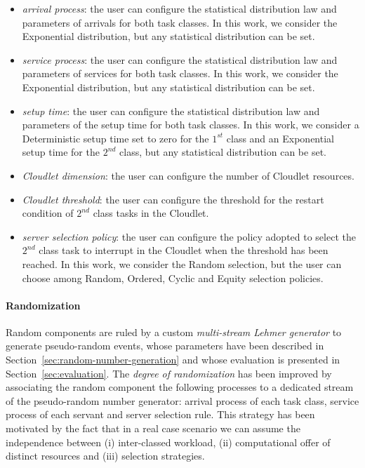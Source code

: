 \begin{itemize}
	\item \textit{arrival process}: the user can configure the statistical distribution law and parameters of arrivals for both task classes. In this work, we consider the Exponential distribution, but any statistical distribution can be set.
	
	\item \textit{service process}: the user can configure the statistical distribution law and parameters of services for both task classes. In this work, we consider the Exponential distribution, but any statistical distribution can be set.
	
	\item \textit{setup time}: the user can configure the statistical distribution law and parameters of the setup time for both task classes. In this work, we consider a Deterministic setup time set to zero for the $1^{st}$ class and an Exponential setup time for the $2^{nd}$ class, but any statistical distribution can be set.
	
	\item \textit{Cloudlet dimension}: the user can configure the number of Cloudlet resources.
	
	\item \textit{Cloudlet threshold}: the user can configure the threshold for the restart condition of $2^{nd}$ class tasks in the Cloudlet.
	
	\item \textit{server selection policy}: the user can configure the policy adopted to select the $2^{nd}$ class task to interrupt in the Cloudlet when the threshold has been reached. In this work, we consider the Random selection, but the user can choose among Random, Ordered, Cyclic and Equity selection policies.
\end{itemize}

\paragraph{Randomization}
Random components are ruled by a custom \textit{multi-stream Lehmer generator} to generate pseudo-random events, whose parameters have been described in Section~\ref{sec:random-number-generation} and whose evaluation is presented in Section~\ref{sec:evaluation}.
The \textit{degree of randomization} has been improved by associating the random component the following processes to a dedicated stream of the pseudo-random number generator: arrival process of each task class, service process of each servant and server selection rule.
This strategy has been motivated by the fact that in a real case scenario we can assume the independence between (i) inter-classed workload, (ii) computational offer of distinct resources and (iii) selection strategies.


